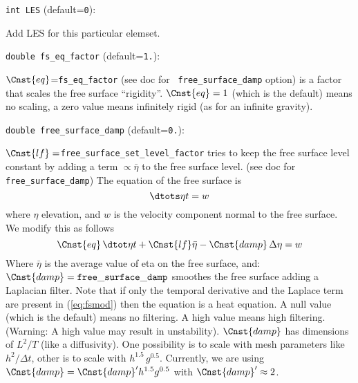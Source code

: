 \item\verb+int LES+ {\rm(default=\verb|0|)}:

Add LES for this particular elemset.

\item\verb+double fs_eq_factor+ {\rm(default=\verb|1.|)}:

$\Cnst{eq}$={\tt fs\_eq\_factor} (see doc for {\tt
free\_surface\_damp} option) is a factor that scales the free
surface ``rigidity''. $\Cnst{eq}=1$ (which is the default) means
no scaling, a zero value means infinitely rigid (as for an
infinite gravity).

\item\verb+double free_surface_damp+ {\rm(default=\verb|0.|)}:

$\Cnst{lf}=${\tt free\_surface\_set\_level\_factor} tries to
keep the free surface level constant by adding a term $\propto
\bar\eta$ to the free surface level.  (see doc for {\tt
free\_surface\_damp})
\label{sec:free_surface}
The equation of the free surface is
%
\begin{equation} 
\dtots\eta t = w
\end{equation}
%
where $\eta$ 
elevation, and $w$ is the velocity component normal to the free
surface. We modify this as follows 
%
\begin{equation} \label{eq:fsmod}  
\Cnst{eq}\,\dtot\eta t 
   + \Cnst{lf} \bar{\eta} - \Cnst{damp} \, \Delta \eta = w
\end{equation}
%
Where $\bar\eta$ is the average value of eta on the free surface, and:
$\Cnst{damp}={\tt free\_surface\_damp}$ smoothes the free surface
adding a Laplacian filter.  Note that if only the temporal derivative
and the Laplace term are present in (\ref{eq:fsmod}) then the equation
is a heat equation. A null value (which is the default) means no
filtering. A high value means high filtering. (Warning: A high value
may result in unstability).  $\Cnst{damp}$ has dimensions of $L^2/T$
(like a diffusivity). One possibility is to scale with mesh parameters
like $h^2/\Delta t$, other is to scale with $h^{1.5} \,
g^{0.5}$. Currently, we are using $\Cnst{damp} = \Cnst{damp}' h^{1.5}
g^{0.5}$ with $\Cnst{damp}'\approx 2$.


